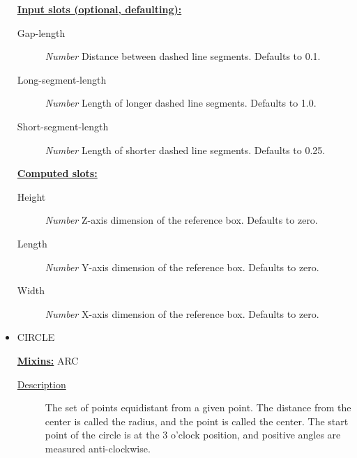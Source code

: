 \documentclass [11pt]{book}
\begin{document}
\begin{itemize}
\textbf{
\underline{Input slots (optional, defaulting):}}

\begin{description}

\item [Gap-length]
\emph{Number} Distance between dashed line segments. Defaults to 0.1.


\item [Long-segment-length]
\emph{Number} Length of longer dashed line segments. Defaults to 1.0.


\item [Short-segment-length]
\emph{Number} Length of shorter dashed line segments. Defaults to 0.25.


\end{description}






\textbf{
\underline{Computed slots:}}

\begin{description}

\item [Height]
\emph{Number} Z-axis dimension of the reference box. Defaults to zero.


\item [Length]
\emph{Number} Y-axis dimension of the reference box. Defaults to zero.


\item [Width]
\emph{Number} X-axis dimension of the reference box. Defaults to zero.


\end{description}







\item {}CIRCLE


\textbf{
\underline{Mixins:}} ARC





\begin{description}

\item [
\underline{Description}]


The set of points equidistant from a given point. 
The distance from the center is called the radius, and the point is called 
the center. The start point of the circle is at the 3 o'clock position, and positive
angles are measured anti-clockwise.




\end{description}
\end{itemize}
\end{document}
